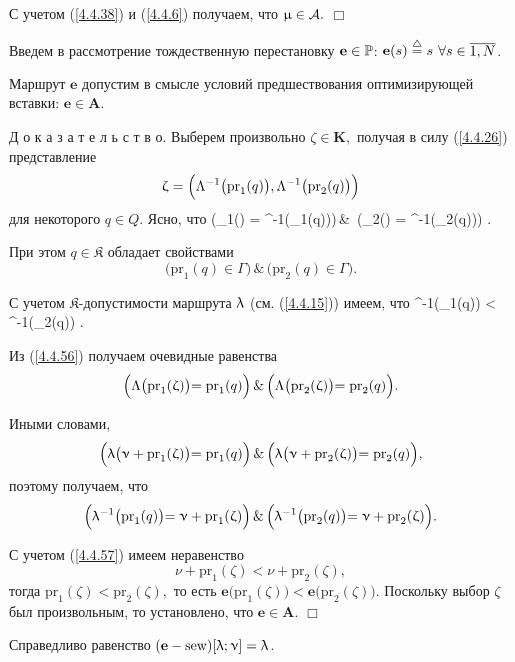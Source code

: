 С учетом (\ref{4.4.38}) и (\ref{4.4.6}) получаем, что
$\upmu\in {\cal A}.$ \hfill $\Box$  \smallskip

Введем в рассмотрение тождественную перестановку
$\mathbf{e}\in {\mathbb P}$:
$\mathbf{e}(s) \stackrel{\triangle}{=} s$
$\fa s\in \ov{1,N}$.

\begin{pred}\label{p4.4.3}
Маршрут $\mathbf{e}$
допустим в смысле условий предшествования оптимизирующей вставки:
$\mathbf{e}\in \mathbf{A}$.
\end{pred}

Д о к а з а т е л ь с т в о.
Выберем произвольно $\zeta \in \mathbf{K},$
получая в силу (\ref{4.4.26}) представление
$$
  \upzeta = \Bigl(\Lambda^{-1}\bigl(\mathrm{pr}_1(q)\bigl), \Lambda^{-1}\bigl(\mathrm{pr}_2(q)\bigl)\Bigl)
$$
для некоторого $q\in Q.$
Ясно, что
\bfn
  \label{4.4.56}
  \Bigl(_1(\zeta) = \La^{-1}\bigl(_1(q)\bigl)\Bigl)\,\&\,
  \Bigl(_2(\zeta) = \La^{-1}\bigl(_2(q)\bigl)\Bigl)
  .
\efn

При этом $q\in \mathfrak{K}$
обладает свойствами
$$
  \bigl(\mathrm{pr}_1(q) \in \Gamma\bigl) \,\&\,\bigl(\mathrm{pr}_2(q) \in \Gamma\bigl)
  .
$$

С учетом
$\mathfrak{K}$-допустимости маршрута $\uplambda$
(см. (\ref{4.4.15})) имеем, что
\bfn
  \label{4.4.57}
  \la^{-1}\bigl(_1(q)\bigl) < \la^{-1}\bigl(_2(q)\bigl)
  .
\efn

Из (\ref{4.4.56})
получаем очевидные равенства
$$
  \Bigl(\Lambda\bigl(\mathrm{pr}_1(\upzeta)\bigl) = \mathrm{pr}_1(q)\Bigl)\,\&\,
  \Bigl(\Lambda\bigl(\mathrm{pr}_2(\upzeta)\bigl) = \mathrm{pr}_2(q)\Bigl)
  .
$$

Иными словами,
$$
  \Bigl(\uplambda\bigl(\upnu + \mathrm{pr}_1(\upzeta)\bigl) = \mathrm{pr}_1(q)\Bigl)\,\&\,
  \Bigl(\uplambda\bigl(\upnu + \mathrm{pr}_2(\upzeta)\bigl) = \mathrm{pr}_2(q)\Bigl)
  ,
$$
поэтому получаем, что
$$
  \Bigl(\uplambda^{-1}\bigl(\mathrm{pr}_1(q)\bigl) = \upnu +\mathrm{pr}_1(\upzeta)\Bigl)\,\&\,
  \Bigl(\uplambda^{-1}\bigl(\mathrm{pr}_2(q)\bigl) = \upnu +\mathrm{pr}_2(\upzeta)\Bigl)
  .
$$

С учетом  (\ref{4.4.57}) имеем неравенство
$$
  \nu +\mathrm{pr}_1(\zeta) < \nu +\mathrm{pr}_2(\zeta)
  ,
$$
тогда
$\mathrm{pr}_1(\zeta) < \mathrm{pr}_2(\zeta),$
то есть
$\mathbf{e}\bigl(\mathrm{pr}_1(\zeta) \bigl) < \mathbf{e}\bigl(\mathrm{pr}_2(\zeta)\bigl).$
Поскольку выбор $\zeta$
был произвольным,
то установлено, что
$\mathbf{e}\in \mathbf{A}.$
\hfill $\Box$

\begin{pred}
\label{p4.4.4}
Справедливо равенство
$(\mathbf{e}- \mathrm{sew})[\uplambda;\upnu] = \uplambda$.
\end{pred}

